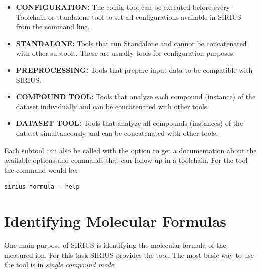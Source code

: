\documentclass[letterpaper,10pt,openany,oneside]{sphinxmanual}
\begin{document}
\begin{itemize}
	\item \textbf{CONFIGURATION: }
	The config tool can be executed before every Toolchain or standalone tool to set all configurations available in SIRIUS from the command line.
	\item \textbf{STANDALONE: }
	Tools that run Standalone and cannot be concatenated with other subtools. These are usually tools for configuration purposes.
	\item \textbf{PREPROCESSING: }
	Tools that prepare input data to be compatible with SIRIUS. 
	\item \textbf{COMPOUND TOOL: }
	Tools that analyze each compound (instance) of the dataset individually and can be concatenated with other tools.
	\item \textbf{DATASET TOOL: }
	Tools that analyze all compounds (instances) of the dataset simultaneously and can be concatenated with other tools.
\end{itemize}

Each subtool can also be called with the  option to get a documentation about the available options and commands that can follow up in a toolchain. For the  tool the command would be: 

\begin{Verbatim}[commandchars=\\\{\}]
sirius formula --help
\end{Verbatim}






\section{Identifying Molecular Formulas}
\label{commandline:identifying-molecular-formulas}
One main purpose of SIRIUS is identifying the molecular formula of the measured ion. For this task SIRIUS provides the  tool. The most basic way to use the  tool is in \emph{single compound mode}:
\end{document}
